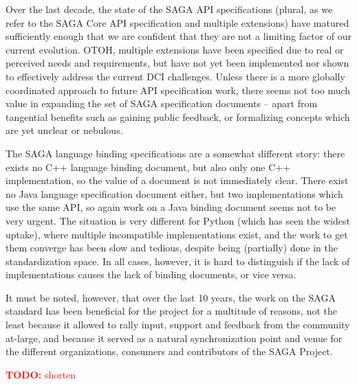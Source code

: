 \documentclass[]{article}
\newcommand{\B}[1]{\textbf{#1}}
\newcommand{\todo}[1]{{\textcolor{red}{\B{TODO:} #1 }}}
\newcommand{\alnote}[1]{{\textcolor{blue}{    \B{AndreL:  } #1 }}}
\newcommand{\alnote}[1]{}
\begin{document}
  Over the last decade, the state of the SAGA API specifications
  (plural, as we refer to the SAGA Core API specification and multiple
  extensions) have matured sufficiently enough that we are confident
  that they are not a limiting factor of our current evolution.  OTOH,
  multiple extensions have been specified due to real or perceived
  needs and requirements, but have not yet been implemented nor shown
  to effectively address the current DCI challenges.  Unless there is
  a more globally coordinated approach to future API specification
  work, there seems not too much value in expanding the set of SAGA
  specification documents -- apart from tangential benefits such as
  gaining public feedback, or formalizing concepts which are yet
  unclear or nebulous.

  The SAGA language binding specifications are a somewhat different
  story: there exists no C++ language binding document, but also only
  one C++ implementation, so the value of a document is not
  immediately clear.  There exist no Java language specification
  document either, but two implementations which use the same API, so 
  again work on a Java binding document seems not to be very urgent.  
  The situation is very different for Python (which has seen the widest 
  uptake), where multiple incompatible implementations exist, and the 
  work to get them converge has been slow and tedious, despite being 
  (partially) done in the standardization space.  In all cases, however, 
  it is hard to distinguish if the lack of implementations causes the 
  lack of binding documents, or vice versa.
  
  It must be noted, however, that over the last 10 years, the work on
  the SAGA standard has been beneficial for the project for a
  multitude of reasons, not the least because it allowed to rally
  input, support and feedback from the community at-large, and because
  it served as a natural synchronization point and venue for the
  different organizations, consumers and contributors of the SAGA
  Project.

  \todo{shorten}

\end{document}
